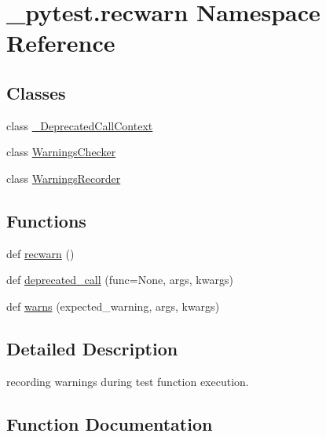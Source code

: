 \hypertarget{namespace__pytest_1_1recwarn}{}\section{\+\_\+pytest.\+recwarn Namespace Reference}
\label{namespace__pytest_1_1recwarn}
\subsection*{Classes}
\begin{DoxyCompactItemize}
\item 
class \hyperlink{class__pytest_1_1recwarn_1_1___deprecated_call_context}{\+\_\+\+Deprecated\+Call\+Context}
\item 
class \hyperlink{class__pytest_1_1recwarn_1_1_warnings_checker}{Warnings\+Checker}
\item 
class \hyperlink{class__pytest_1_1recwarn_1_1_warnings_recorder}{Warnings\+Recorder}
\end{DoxyCompactItemize}
\subsection*{Functions}
\begin{DoxyCompactItemize}
\item 
def \hyperlink{namespace__pytest_1_1recwarn_acb43770689a1e4cce8a34dfb8378d806}{recwarn} ()
\item 
def \hyperlink{namespace__pytest_1_1recwarn_aae3ce5c0948bb6886dd22c40c4550a5a}{deprecated\+\_\+call} (func=None, args, kwargs)
\item 
def \hyperlink{namespace__pytest_1_1recwarn_a50538fa73c5c292ebad07a9c936c7b53}{warns} (expected\+\_\+warning, args, kwargs)
\end{DoxyCompactItemize}


\subsection{Detailed Description}
\begin{DoxyVerb}recording warnings during test function execution. \end{DoxyVerb}
 

\subsection{Function Documentation}
\mbox{\label{namespace__pytest_1_1recwarn_aae3ce5c0948bb6886dd22c40c4550a5a}} 
